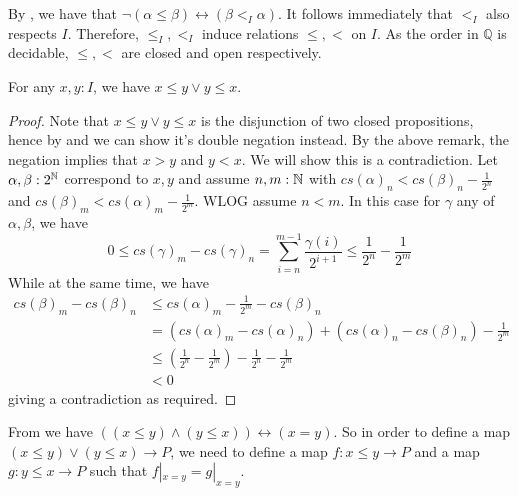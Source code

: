 \begin{remark}
  By , we have that $\neg (\alpha \leq \beta) \leftrightarrow (\beta <_I \alpha)$. 
  It follows immediately that $<_I$ also respects $I$. 
  Therefore, $\leq_I, <_I$ induce relations $\leq,<$ on $I$.
  As the order in $\mathbb Q$ is decidable, $\leq, <$ are closed and open respectively. 
\end{remark} 

\begin{lemma}\label{IntervalOrderLeqOrGeq}
  For any $x,y:I$, we have $x\leq y \vee y \leq x$. 
\end{lemma}
\begin{proof}
  Note that $x\leq y \vee y \leq x$ is the disjunction of two closed propositions, hence by 
   and  we can show it's double negation instead. 
  By the above remark, the negation implies that $x>y$ and $y<x$. We will show this is a contradiction. 
  Let $\alpha,\beta:2^{\mathbb{N}}$ correspond to $x,y$ and assume $n,m:\mathbb{N}$ with 
  $cs(\alpha)_n < cs(\beta)_n-\frac{1}{2^n}$ and 
  $cs(\beta)_m < cs(\alpha)_m-\frac{1}{2^m}$. 
  WLOG assume $n<m$. In this case for $\gamma$ any of $\alpha,\beta$, we have
  $$0\leq cs(\gamma)_m - cs(\gamma)_n = \sum_{i = n}^{m-1} \frac{\gamma(i)}{2^{i+1}}\leq \frac{1}{2^n}-\frac{1}{2^m}$$
  While at the same time, we have 
  \begin{align}
    cs(\beta)_m - cs(\beta)_n &\leq cs(\alpha)_m -\frac{1}{2^m} - cs (\beta)_n \\
                              & = (cs(\alpha)_m-cs(\alpha)_n)  +      (cs(\alpha)_n -cs(\beta)_n) - \frac{1}{2^m}\\
                              & \leq (\frac{1}{2^n} - \frac{1}{2^m}) -\frac{1}{2^n}               - \frac{1}{2^m}\\
                              &<0
  \end{align}
  giving a contradiction as required. 
\end{proof}

\begin{remark}\label{rmkMapOutOfLeqGeq}
  From  we have $((x\leq y) \wedge (y \leq x )) \leftrightarrow (x = y)$. 
  So in order to define a map $(x \leq y) \vee (y \leq x) \to P$, we need to define a map 
  $f:x\leq y \to P$ and a map $g:y \leq x \to P$ such that $f|_{x = y} = g|_{x=y}$. 
\end{remark}





